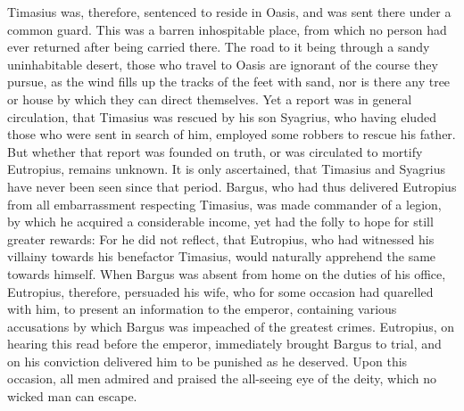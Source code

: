 Timasius was, therefore, sentenced to reside in Oasis, and was sent there under a common guard. This was a barren inhospitable place, from which no person had ever returned after being carried there. The road to it being through a sandy uninhabitable desert, those who travel to Oasis are ignorant of the course they pursue, as the wind fills up the tracks of the feet with sand, nor is there any tree or house by which they can direct themselves. Yet a report was in general circulation, that Timasius was rescued by his son Syagrius, who having eluded those who were sent in search of him, employed some robbers to rescue his father. But whether that report was founded on truth, or was circulated to mortify Eutropius, remains unknown. It is only ascertained, that Timasius and Syagrius have never been seen since that period. Bargus, who had thus delivered Eutropius from all embarrassment respecting Timasius, was made commander of a legion, by which he acquired a considerable income, yet had the folly to hope for still greater rewards: For he did not reflect, that Eutropius, who had witnessed his villainy towards his benefactor Timasius, would naturally apprehend the same towards himself. When Bargus was absent from home on the duties of his office, Eutropius, therefore, persuaded his wife, who for some occasion had quarelled with him, to present an information to the emperor, containing various accusations by which Bargus was impeached of the greatest crimes. Eutropius, on hearing this read before the emperor, immediately brought Bargus to trial, and on his conviction delivered him to be punished as he deserved. Upon this occasion, all men admired and praised the all-seeing eye of the deity, which no wicked man can escape.


